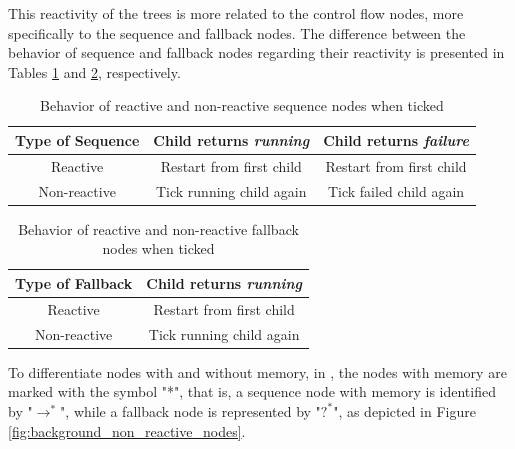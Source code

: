 This reactivity of the trees is more related to the control flow nodes, more specifically to the sequence and fallback nodes. The difference between the behavior of sequence and fallback nodes regarding their reactivity is presented in Tables \ref{tab:sequence_reactivity} and \ref{tab:fallback_reactivity}, respectively.

\begin{table}[h]
    \centering
    \begin{tabular}{c c c}
        \toprule
        Type of Sequence & Child returns \textit{running} & Child returns \textit{failure} \\
        \midrule
        Reactive         & Restart from first child       & Restart from first child       \\
        Non-reactive     & Tick running child again       & Tick failed child again        \\
        \bottomrule
    \end{tabular}
    \caption{Behavior of reactive and non-reactive sequence nodes when ticked}
    \label{tab:sequence_reactivity}
\end{table}

\begin{table}[h]
    \centering
    \begin{tabular}{c c}
        \toprule
        Type of Fallback & Child returns \textit{running} \\
        \midrule
        Reactive         & Restart from first child       \\
        Non-reactive     & Tick running child again       \\
        \bottomrule
    \end{tabular}
    \caption{Behavior of reactive and non-reactive fallback nodes when ticked}
    \label{tab:fallback_reactivity}
\end{table}

To differentiate nodes with and without memory, in \cite{BTsInRobotics}, the nodes with memory are marked with the symbol "*", that is, a sequence node with memory is identified by "$\rightarrow^*$", while a fallback node is represented by "$?^*$", as depicted in Figure \ref{fig:background_non_reactive_nodes}.


